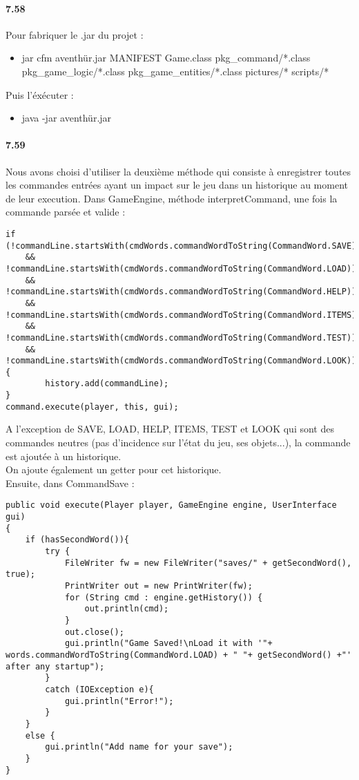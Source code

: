 \documentclass[11pt,a4paper]{report}
\begin{document}
\paragraph{7.58}
Pour fabriquer le .jar du projet :
\begin{itemize}
\item jar cfm aventhür.jar MANIFEST Game.class pkg\_command/*.class pkg\_game\_logic/*.class pkg\_game\_entities/*.class pictures/* scripts/*
\end{itemize}
Puis l'éxécuter :
\begin{itemize}
\item java -jar aventhür.jar
\end{itemize}

\paragraph{7.59}
Nous avons choisi d'utiliser la deuxième méthode qui consiste à enregistrer toutes les commandes entrées ayant un impact sur le jeu dans un historique au moment de leur execution. Dans GameEngine, méthode interpretCommand, une fois la commande parsée et valide :
\begin{lstlisting}
if (!commandLine.startsWith(cmdWords.commandWordToString(CommandWord.SAVE))
    && !commandLine.startsWith(cmdWords.commandWordToString(CommandWord.LOAD))
    && !commandLine.startsWith(cmdWords.commandWordToString(CommandWord.HELP))
    && !commandLine.startsWith(cmdWords.commandWordToString(CommandWord.ITEMS))
    && !commandLine.startsWith(cmdWords.commandWordToString(CommandWord.TEST))
    && !commandLine.startsWith(cmdWords.commandWordToString(CommandWord.LOOK))) {
        history.add(commandLine);
}
command.execute(player, this, gui);
\end{lstlisting}
A l'exception de SAVE, LOAD, HELP, ITEMS, TEST et LOOK qui sont des commandes neutres (pas d'incidence sur l'état du jeu, ses objets...), la commande est ajoutée à un historique.\\
On ajoute également un getter pour cet historique.\\
Ensuite, dans CommandSave :
\begin{lstlisting}
public void execute(Player player, GameEngine engine, UserInterface gui)
{
    if (hasSecondWord()){
        try {
            FileWriter fw = new FileWriter("saves/" + getSecondWord(), true);
            PrintWriter out = new PrintWriter(fw);
            for (String cmd : engine.getHistory()) {
                out.println(cmd);
            }
            out.close();
            gui.println("Game Saved!\nLoad it with '"+ words.commandWordToString(CommandWord.LOAD) + " "+ getSecondWord() +"' after any startup");
        }
        catch (IOException e){
            gui.println("Error!");
        }
    }
    else {
        gui.println("Add name for your save");
    }
}
\end{lstlisting}
\end{document}
